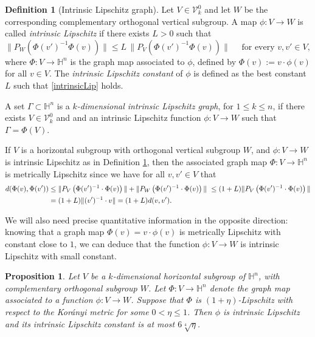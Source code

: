 \documentclass[12pt]{amsart}
\renewcommand{\H}{\mathbb H}
\numberwithin{equation}{section}
\theoremstyle{plain}
\newtheorem{proposition}[theorem]{Proposition}
\theoremstyle{definition}
\newtheorem{definition}[theorem]{Definition}
\theoremstyle{remark}
\begin{document}
\begin{definition}[Intrinsic Lipschitz graph]\label{d:kDIMiLG}
 Let $V\in \mathcal{V}_k^0$ and let $W$ be the corresponding complementary orthogonal vertical subgroup. A map $\phi:V\to W$ is called \textit{intrinsic Lipschitz} if there exists $L>0$ such that
 \begin{equation}\label{intrinsicLip}\|P_W\left(\Phi(v')^{-1}\Phi(v)\right)\|\leq L\,\|P_V\left(\Phi(v')^{-1}\Phi(v)\right)\|\quad\text{ for every }v,v'\in V,\end{equation}
 where $\Phi: V\to\H^n$ is the graph map associated to $\phi$, defined by $\Phi(v):=v\cdot\phi(v)$ for all $v\in V$. 
 The \textit{intrinsic Lipschitz constant} of $\phi$ is defined as the best constant $L$ such that \eqref{intrinsicLip} holds.

 
 A set $\Gamma \subset \mathbb{H}^n$ is a \emph{$k$-dimensional intrinsic Lipschitz graph}, for $1\leq k\leq n$, if there exists $V\in \mathcal{V}_k^0$ and 
 and an intrinsic Lipschitz function $\phi:V \to W$ such that $\Gamma = \Phi(V)$.


 

\end{definition}


If $V$ is a horizontal subgroup with orthogonal vertical subgroup $W$, and $\phi:V \to W$ is intrinsic Lipschitz as in Definition \ref{d:kDIMiLG}, then the associated graph map $\Phi:V \to \mathbb{H}^n$ is metrically Lipschitz since we have
for all $v,v'\in V$ that
\begin{align}\label{eq:GraphMapMetricLip}
d(\Phi(v),\Phi(v'))&\leq \|P_V\left(\Phi(v')^{-1}\cdot \Phi(v)\right)\|+\|P_W\left(\Phi(v')^{-1}\cdot \Phi(v)\right)\|\notag\ \leq (1+L)\|P_V\left(\Phi(v')^{-1}\cdot \Phi(v)\right)\|\notag\\
&= (1+L) \|(v')^{-1} \cdot v\| = (1+L) d(v,v').
\end{align}


We will also need precise quantitative information in the opposite direction: knowing that a graph map $\Phi(v)=v\cdot \phi(v)$ is metrically Lipschitz with constant close to $1$, we can deduce that the function $\phi:V \to W$ is intrinsic Lipschitz with small constant. 
 \begin{proposition}\label{prop_lipgraph} 
        Let $V$ be a $k$-dimensional horizontal subgroup of $\H^n$, with complementary orthogonal subgroup $W$. Let $\Phi:V\to\H^n$ denote the graph map associated to a function $\phi:V\to W$. Suppose that $\Phi$ is $(1+\eta)$-Lipschitz with respect to the Kor\'{a}nyi metric for some $0<\eta\leq 1$. Then $\phi$ is intrinsic Lipschitz and its intrinsic Lipschitz constant is at most $6\sqrt[4]{\eta}$.
    \end{proposition}
\end{document}
